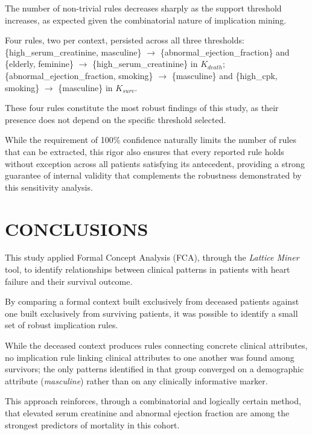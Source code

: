 \documentclass[a4paper,twoside]{article}
\begin{document}
The number of non-trivial rules decreases sharply as the support threshold increases, as expected given the combinatorial nature of implication mining. 

Four rules, two per context, persisted across all three thresholds: \{high\_serum\_creatinine, masculine\} $\rightarrow$ \{abnormal\_ejection\_fraction\} and \{elderly, feminine\} $\rightarrow$ \{high\_serum\_creatinine\} in $K_{death}$; \{abnormal\_ejection\_fraction, smoking\} $\rightarrow$ \{masculine\} and \{high\_cpk, smoking\} $\rightarrow$ \{masculine\} in $K_{surv}$. 

These four rules constitute the most robust findings of this study, as their presence does not depend on the specific threshold selected.

While the requirement of 100\% confidence naturally limits the number of rules that can be extracted, this rigor also ensures that every reported rule holds without exception across all patients satisfying its antecedent, providing a strong guarantee of internal validity that complements the robustness demonstrated by this sensitivity analysis.



\section{\uppercase{Conclusions}}
\label{sec:conclusion}

This study applied Formal Concept Analysis (FCA), through the \textit{Lattice Miner} tool, to identify relationships between clinical patterns in patients with heart failure and their survival outcome. 

By comparing a formal context built exclusively from deceased patients against one built exclusively from surviving patients, it was possible to identify a small set of robust implication rules.

While the deceased context produces rules connecting concrete clinical attributes, no implication rule linking clinical attributes to one another was found among survivors; the only patterns identified in that group converged on a demographic attribute (\textit{masculine}) rather than on any clinically informative marker.

This approach reinforces, through a combinatorial and logically certain method, that elevated serum creatinine and abnormal ejection fraction are among the strongest predictors of mortality in this cohort. 
\end{document}
